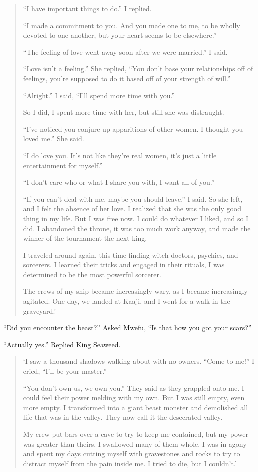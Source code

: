 \begin{quote}
``I have important things to do.'' I replied.

``I made a commitment to you. And you made one to me, to be wholly devoted to one another, but your heart seems to be elsewhere.''

``The feeling of love went away soon after we were married.'' I said.

``Love isn't a feeling.'' She replied, ``You don't base your relationships off of feelings, you're supposed to do it based off of your strength of will.''

``Alright.'' I said, ``I'll spend more time with you.''

So I did, I spent more time with her, but still she was distraught.

``I've noticed you conjure up apparitions of other women. I thought you loved me.'' She said.

``I do love you. It's not like they're real women, it's just a little entertainment for myself.''

``I don't care who or what I share you with, I want all of you.''

``If you can't deal with me, maybe you should leave.'' I said.
So she left, and I felt the absence of her love.
I realized that she was the only good thing in my life.
But I was free now. I could do whatever I liked, and so I did.
I abandoned the throne, it was too much work anyway, and made the winner of the tournament the next king.

I traveled around again, this time finding witch doctors, psychics, and sorcerers. I learned their tricks and engaged in their rituals, I was determined to be the most powerful sorcerer.

The crews of my ship became increasingly wary, as I became increasingly agitated.
One day, we landed at Kaaji, and I went for a walk in the graveyard.'
\end{quote}

``Did you encounter the beast?'' Asked Mwefu, ``Is that how you got your scars?''

``Actually yes.'' Replied King Seaweed.

\begin{quote}
`I saw a thousand shadows walking about with no owners. ``Come to me!'' I cried, ``I'll be your master.''

``You don't own us, we own you.'' They said as they grappled onto me. I could feel their power melding with my own. But I was still empty, even more empty.
I transformed into a giant beast monster and demolished all life that was in the valley.
They now call it the desecrated valley.

My crew put bars over a cave to try to keep me contained, but my power was greater than theirs, I swallowed many of them whole. I was in agony and spent my days cutting myself with gravestones and rocks to try to distract myself from the pain inside me. I tried to die, but I couldn't.'
\end{quote}

